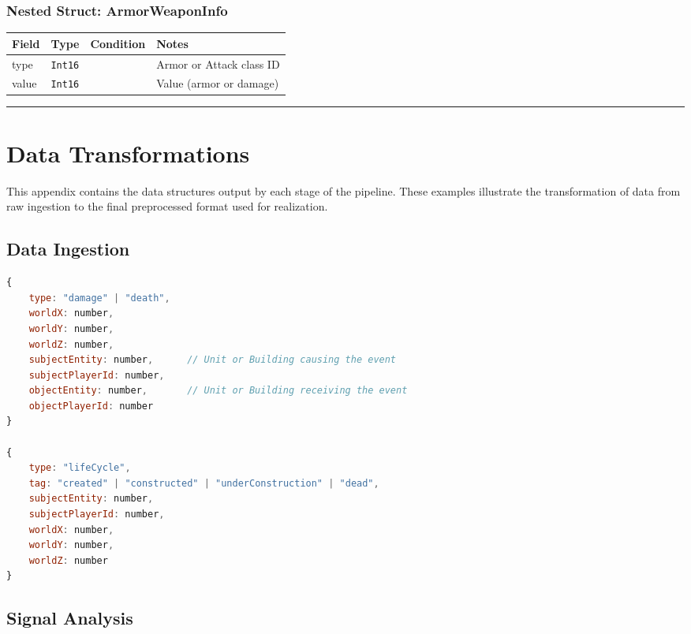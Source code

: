 \subsubsection*{Nested Struct: ArmorWeaponInfo}

\begin{longtable}{@{}p{}p{}p{}p{}@{}}
  \toprule
  Field & Type & Condition & Notes \\
  \midrule
  \endhead
  type & \texttt{Int16} & & Armor or Attack class ID \\
  value & \texttt{Int16} & & Value (armor or damage) \\
  \bottomrule
\end{longtable}

\par\noindent\rule{\textwidth}{0.4pt}

\section{Data Transformations}\label{appendix:examples}

This appendix contains the data structures output by each stage of the pipeline. These examples illustrate the transformation of data from raw ingestion to the final preprocessed format used for realization.

\subsection{Data Ingestion}
\label{sec:example-ingestion}
\begin{lstlisting}[language=JavaScript, caption={Raw event input stream to Signal Analysis.}, label={lst:signal-input}]
{
    type: "damage" | "death",
    worldX: number,
    worldY: number,
    worldZ: number,
    subjectEntity: number,      // Unit or Building causing the event
    subjectPlayerId: number,
    objectEntity: number,       // Unit or Building receiving the event
    objectPlayerId: number
}

{
    type: "lifeCycle",
    tag: "created" | "constructed" | "underConstruction" | "dead",
    subjectEntity: number,
    subjectPlayerId: number,
    worldX: number,
    worldY: number,
    worldZ: number
}
\end{lstlisting}

\subsection{Signal Analysis}
\label{sec:example-signal}

